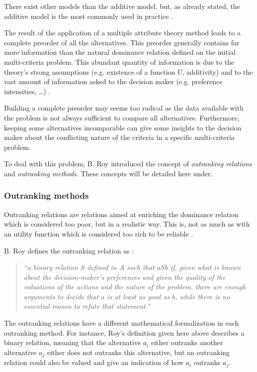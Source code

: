 There exist other models than the additive model, but, as already stated, the additive model is the most commonly used in practice \cite{Vin92}.

The result of the application of a multiple attribute theory method leads to a complete preorder of all the alternatives. This preorder generally contains far more information than the natural dominance relation defined on the initial multi-criteria problem.
This abundant quantity of information is due to the theory's strong assumptions (e.g. existence of a function $U$, additivity) and to the vast amount of information asked to the decision maker (e.g. preference intensities, \dots) \cite{Vin92}.

Building a complete preorder may seems too radical as the data available with the problem is not always sufficient to compare all alternatives.
Furthermore, keeping some alternatives incomparable can give some insights to the decision maker about the conflicting nature of the criteria in a specific multi-criteria problem.

To deal with this problem, B. Roy introduced the concept of \textit{outranking relations} and \textit{outranking methods}. These concepts will be detailed here under.



\subsubsection{Outranking methods}

Outranking relations are relations aimed at enriching the dominance relation which is considered too poor, but in a realistic way.
This is, not as much as with an utility function which is considered too rich to be reliable \cite{Bertrand2002}.

B. Roy defines the outranking relation as \cite{roy1book85}:

\begin{quote}
\textit{    
``a binary relation $S$ defined in $A$ such that $aSb$ if, given what is known about the decision-maker's preferences and given the quality of the valuations of the actions and the nature of the problem, there are enough arguments to decide that $a$ is at least as good as $b$, while there is no essential reason to refute that statement.''}
\end{quote}

The outranking relations have a different mathematical formalization in each outranking method.
For instance, Roy's definition given here above describes a binary relation, meaning that the alternative $a_i$ either outranks another alternative $a_j$ either does not outranks this alternative, but an outranking relation could also be valued and give an indication of how $a_i$ outranks $a_j$. 

